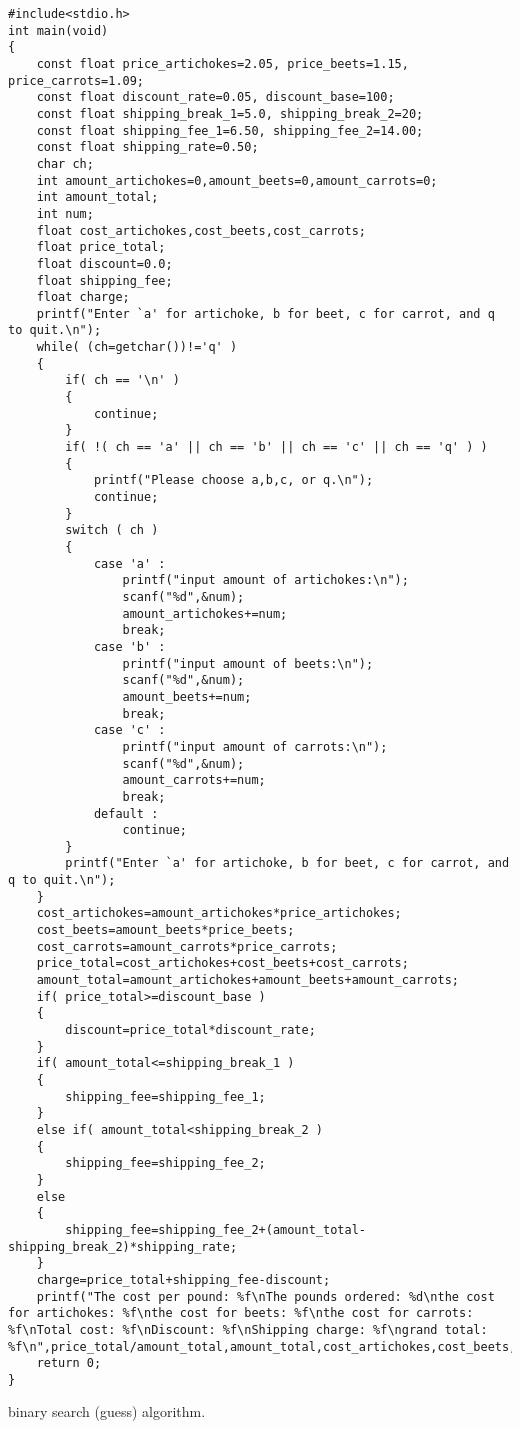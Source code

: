 \begin{solution}
  \begin{verbatim}
#include<stdio.h>
int main(void)
{
	const float price_artichokes=2.05, price_beets=1.15, price_carrots=1.09;
	const float discount_rate=0.05, discount_base=100;
	const float shipping_break_1=5.0, shipping_break_2=20;
	const float shipping_fee_1=6.50, shipping_fee_2=14.00;
	const float shipping_rate=0.50;
	char ch;
	int amount_artichokes=0,amount_beets=0,amount_carrots=0;
	int amount_total;
	int num;
	float cost_artichokes,cost_beets,cost_carrots;
	float price_total;
	float discount=0.0;
	float shipping_fee;
	float charge;
	printf("Enter `a' for artichoke, b for beet, c for carrot, and q to quit.\n");
	while( (ch=getchar())!='q' )
	{
		if( ch == '\n' )
		{
			continue;
		}
		if( !( ch == 'a' || ch == 'b' || ch == 'c' || ch == 'q' ) )
		{
			printf("Please choose a,b,c, or q.\n");
			continue;
		}
		switch ( ch )
		{
			case 'a' :
				printf("input amount of artichokes:\n");
				scanf("%d",&num);
				amount_artichokes+=num;
				break;
			case 'b' :
				printf("input amount of beets:\n");
				scanf("%d",&num);
				amount_beets+=num;
				break;
			case 'c' :
				printf("input amount of carrots:\n");
				scanf("%d",&num);
				amount_carrots+=num;
				break;
			default :
				continue;
		}
		printf("Enter `a' for artichoke, b for beet, c for carrot, and q to quit.\n");
	}
	cost_artichokes=amount_artichokes*price_artichokes;
	cost_beets=amount_beets*price_beets;
	cost_carrots=amount_carrots*price_carrots;
	price_total=cost_artichokes+cost_beets+cost_carrots;
	amount_total=amount_artichokes+amount_beets+amount_carrots;
	if( price_total>=discount_base )
	{
		discount=price_total*discount_rate;
	}
	if( amount_total<=shipping_break_1 )
	{
		shipping_fee=shipping_fee_1;
	}
	else if( amount_total<shipping_break_2 )
	{
		shipping_fee=shipping_fee_2;
	}
	else
	{
		shipping_fee=shipping_fee_2+(amount_total-shipping_break_2)*shipping_rate;
	}
	charge=price_total+shipping_fee-discount;
	printf("The cost per pound: %f\nThe pounds ordered: %d\nthe cost for artichokes: %f\nthe cost for beets: %f\nthe cost for carrots: %f\nTotal cost: %f\nDiscount: %f\nShipping charge: %f\ngrand total: %f\n",price_total/amount_total,amount_total,cost_artichokes,cost_beets,cost_carrots,price_total,discount,shipping_fee,charge);
	return 0;
}
  \end{verbatim}
\end{solution}
\begin{question}
  binary search (guess) algorithm.
\end{question}
